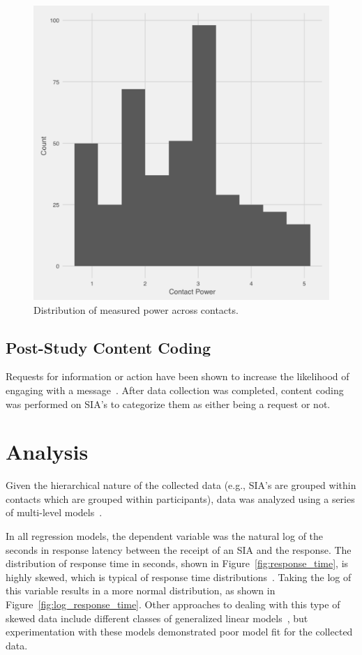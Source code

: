 \documentclass[12pt]{nuthesis}	%
\begin{document}
\begin{figure}[h]
\centering
\includegraphics[width=.7\textwidth]{figures/power_distribution}
\caption{Distribution of measured power across contacts.}
\label{fig:power}
\end{figure}

\subsection{Post-Study Content Coding}

Requests for information or action have been shown to increase the likelihood of engaging with a message~\citep{dabbish2005understanding}. After data collection was completed, content coding was performed on SIA's to categorize them as either being a request or not.

\section{Analysis}

Given the hierarchical nature of the collected data (e.g., SIA's are grouped within contacts which are grouped within participants), data was analyzed using a series of multi-level models~\citep{gelman2007data}.

In all regression models, the dependent variable was the natural log of the seconds in response latency between the receipt of an SIA and the response. The distribution of response time in seconds, shown in Figure~\ref{fig:response_time}, is highly skewed, which is typical of response time distributions~\citep{kalman2006pauses}. Taking the log of this variable results in a more normal distribution, as shown in Figure~\ref{fig:log_response_time}. Other approaches to dealing with this type of skewed data include different classes of generalized linear models~\citep[see e.g.,][]{buntin2004too,dick2004beyond,manning2001estimating}, but experimentation with these models demonstrated poor model fit for the collected data.
\end{document}
